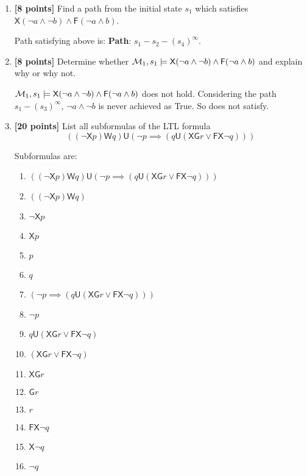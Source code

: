 \documentclass{article}
\def\Sometime{\mathord{\mathsf{F}}}
\def\Forever{\mathord{\mathsf{G}}}
\def\NextX{\mathord{\mathsf{X}}}
\def\Until{\mathrel{\mathsf{U}}}
\def\WeakUntil{\mathrel{\mathsf{W}}}
\begin{document}
\begin{enumerate}
\begin{answer}
    \end{answer}
  \item \textbf{[8 points]} Find a path from the initial state $s_1$
    which satisfies
    $\NextX (\neg a \land \neg b) \land \Sometime (\neg a \land b)$.
        
\begin{answer}
    	Path satisfying above is:
    	\textbf{Path}: $s_1-s_2-(s_4)^\infty$.	\newline
   	
    \end{answer}

  \item \textbf{[8 points]} Determine whether
    ${\cal M}_1, s_1 \models \NextX (\neg a \land \neg b) \land
    \Sometime (\neg a \land b)$ and explain why or why not.
        
\begin{answer}
${\cal M}_1, s_1 \models \NextX (\neg a \land \neg b) \land
    \Sometime (\neg a \land b)$  does not hold. Considering the path $s_1-(s_3)^\infty$, $\neg a \land \neg b$ is never achieved as True. So does not satisfy.
   	
    \end{answer}

\item \textbf{[20 points]} List all subformulas of the LTL formula
  \begin{displaymath}
    ((\neg \NextX p) \WeakUntil q) \Until (\neg p \implies (q \Until
    (\NextX \Forever r \lor \Sometime \NextX \neg q)))
  \end{displaymath}
 \begin{answer} 
 Subformulas are:\newline
 \begin{enumerate}
\item  $((\neg \NextX p) \WeakUntil q) \Until (\neg p \implies (q \Until
    (\NextX \Forever r \lor \Sometime \NextX \neg q)))$  
 \item$((\neg \NextX p) \WeakUntil q)$ 
 \item$\neg \NextX p$
 \item$\NextX p$
 \item$p$
 \item$q$ 
 \item$(\neg p \implies (q \Until(\NextX \Forever r \lor \Sometime \NextX \neg q)))$
 \item$\neg p$
 \item$q \Until(\NextX \Forever r \lor \Sometime \NextX \neg q)$
 \item$(\NextX \Forever r \lor \Sometime \NextX \neg q)$
 \item$\NextX \Forever r$
 \item$\Forever r$ 
 \item$r$ 
 \item$\Sometime\NextX \neg q$
 \item$\NextX \neg q$
 \item$\neg q$
 \end{enumerate}
 
 
  
\end{answer}
\end{enumerate}
\end{document}
